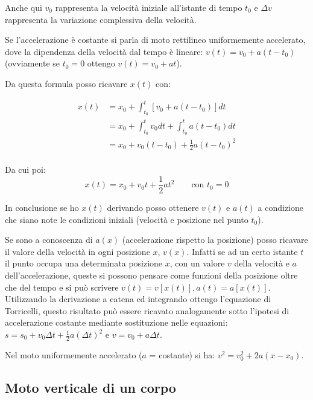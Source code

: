 \documentclass[class=book, crop=false, oneside, 12pt]{standalone}
\begin{document}
Anche qui \(v_0\) rappresenta la velocità iniziale all'istante di tempo
\(t_0\) e \(\Delta v\) rappresenta la variazione complessiva
della velocità.

Se l'accelerazione è costante si parla di moto rettilineo uniformemente
accelerato, dove la dipendenza della velocità dal tempo è lineare:
\(v(t) = v_0 + a(t-t_0)\) (ovviamente se \(t_0 = 0\) ottengo
\(v(t) = v_0 + at\)).

Da questa formula posso ricavare \(x(t)\) con:

\begin{equation}
  \begin{aligned}
    x(t) &= x_0 + \int_{t_0}^{t} [v_0 + a(t-t_0)] dt\\
         &= x_0 + \int_{t_0}^{t}v_0 dt+ \int_{t_0}^t a (t-t_0) dt\\
         &= x_0 + v_0(t-t_0) + \frac{1}{2} a(t-t_0)^2\\
  \end{aligned}
\end{equation}

Da cui poi:
\begin{equation}
  x(t) = x_0 + v_0 t + \frac {1} {2} a t^2 \qquad \text{con \(t_0=0\)}
\end{equation}

In conclusione se ho \(x(t)\) derivando posso ottenere \(v(t)\) e
\(a(t)\) a condizione che siano note le condizioni iniziali (velocità e
posizione nel punto \(t_0\)).

Se sono a conoscenza di \(a(x)\) (accelerazione rispetto la posizione)
posso ricavare il valore della velocità in ogni posizione \(x\),
\(v(x)\). Infatti se ad un certo istante \(t\) il punto occupa una
determinata posizione \(x\), con un valore \(v\) della velocità e \(a\)
dell'accelerazione, queste si possono pensare come funzioni della
posizione oltre che del tempo e si può scrivere
\(v(t) = v[x(t)], a(t)=a[x (t)]\). Utilizzando la derivazione a catena
ed integrando ottengo l'equazione di Torricelli, questo risultato può
essere ricavato analogamente sotto l'ipotesi di accelerazione costante
mediante sostituzione nelle equazioni:
\(s = s_0 + v_0\Delta t + \frac {1}{2} a(\Delta t)^2\) e
\(v = v_0 + a\Delta t\).

Nel moto uniformemente accelerato (\(a\) = costante) si ha:
\(v^2 = v_0^2 +2a (x-x_0)\).


\subsection{\texorpdfstring{Moto verticale di un corpo
}{Moto verticale di un corpo }}
\end{document}
